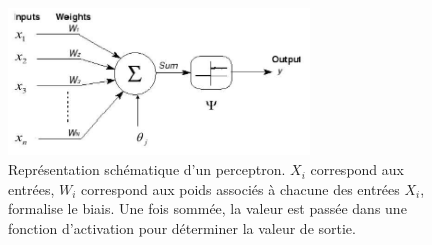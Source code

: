 \begin{figure}
  \centering
  \includegraphics[width=8cm]{./Chapitre2/figures/perceptron.png}
  \caption{Représentation schématique d'un perceptron. $X_i$ correspond aux entrées, $W_i$ correspond aux poids associés à chacune des entrées $X_i$, \theta formalise le biais. Une fois sommée, la valeur est passée dans une fonction d'activation pour déterminer la valeur de sortie.}
  \label{fig:perceptron}
\end{figure}
